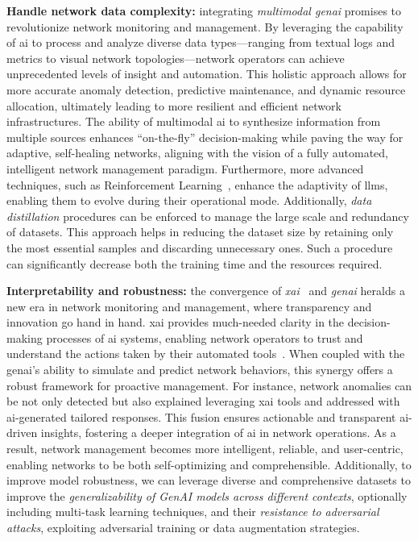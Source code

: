\vspace{5pt}
\noindent
\textbf{Handle network data complexity:}
integrating \emph{multimodal \gls{genai}} promises to revolutionize network monitoring and management. 
By leveraging the capability of \gls{ai} to process and analyze diverse data types---ranging from textual logs and metrics to visual network topologies---network operators can achieve unprecedented levels of insight and automation.
This holistic approach allows for more accurate anomaly detection, predictive maintenance, and dynamic resource allocation, ultimately leading to more resilient and efficient network infrastructures.
%
The ability of multimodal \gls{ai} to synthesize information from multiple sources enhances ``on-the-fly'' decision-making while paving the way for adaptive, self-healing networks, aligning with the vision of a fully automated, intelligent network management paradigm.
Furthermore, more advanced techniques,
such as Reinforcement Learning~\cite{du2023beyond, du2024enhancing}, enhance the adaptivity of \glspl{llm}, enabling them to evolve during their operational mode.
Additionally, \textit{data distillation} procedures can be enforced to manage the large scale and redundancy of datasets.
This approach helps in reducing the dataset size by retaining only the most essential samples and discarding unnecessary ones. 
Such a procedure can significantly decrease both the training time and the resources required.
%

%
\vspace{5pt}
\noindent
\textbf{Interpretability and robustness:}
%
the convergence of \emph{\gls{xai}}~\cite{xu2019explainable, dwivedi2023explainable} and \emph{\gls{genai}} heralds a new era in network monitoring and management, where transparency and innovation go hand in hand. 
%
\gls{xai} provides much-needed clarity in the decision-making processes of \gls{ai} systems, enabling network operators to trust and understand the actions taken by their automated tools~\cite{nascita2024survey}.
%
When coupled with the \gls{genai}'s ability to simulate and predict network behaviors, this synergy offers a robust framework for proactive management. For instance, network anomalies can be not only detected but also explained leveraging \gls{xai} tools and addressed with \gls{ai}-generated tailored responses. 
This fusion ensures actionable and transparent \gls{ai}-driven insights,
fostering a deeper integration of \gls{ai} in network operations. 
As a result, network management becomes more intelligent, reliable, and user-centric, 
%
enabling networks to be
%
both self-optimizing and comprehensible.
%
Additionally, to improve model robustness, we can leverage diverse and comprehensive datasets to improve the \textit{generalizability of GenAI models across different contexts}, optionally including multi-task learning techniques, and their \textit{resistance to adversarial attacks}, exploiting adversarial training or data augmentation strategies. 


